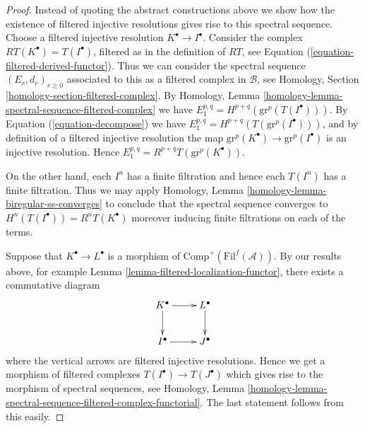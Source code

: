 \begin{proof}
Instead of quoting the abstract constructions above we
show how the existence of filtered injective resolutions gives
rise to this spectral sequence.
Choose a filtered injective resolution $K^\bullet \to I^\bullet$.
Consider the complex $RT(K^\bullet) = T(I^\bullet)$, filtered as
in the definition of $RT$, see
Equation (\ref{equation-filtered-derived-functor}).
Thus we can consider the spectral sequence
$(E_r, d_r)_{r \geq 0}$ associated to
this as a filtered complex in $\mathcal{B}$, see
Homology, Section \ref{homology-section-filtered-complex}.
By
Homology, Lemma \ref{homology-lemma-spectral-sequence-filtered-complex}
we have $E_1^{p, q} = H^{p + q}(\text{gr}^p(T(I^\bullet)))$.
By Equation (\ref{equation-decompose}) we have
$E_1^{p, q} = H^{p + q}(T(\text{gr}^p(I^\bullet)))$, and
by definition of a filtered injective resolution the
map $\text{gr}^p(K^\bullet) \to \text{gr}^p(I^\bullet)$
is an injective resolution. Hence
$E_1^{p, q} = R^{p + q}T(\text{gr}^p(K^\bullet))$.

\medskip\noindent
On the other hand, each $I^n$ has a finite filtration and hence
each $T(I^n)$ has a finite filtration. Thus we may apply
Homology, Lemma \ref{homology-lemma-biregular-ss-converges}
to conclude that the
spectral sequence converges to $H^n(T(I^\bullet)) = R^nT(K^\bullet)$
moreover inducing finite filtrations on each of the terms.

\medskip\noindent
Suppose that $K^\bullet \to L^\bullet$ is a morphism of
$\text{Comp}^{+}(\text{Fil}^f(\mathcal{A}))$. By our results above,
for example Lemma \ref{lemma-filtered-localization-functor}, there
exists a commutative diagram
$$
\xymatrix{
K^\bullet \ar[r] \ar[d] & L^\bullet \ar[d] \\
I^\bullet \ar[r] & J^\bullet
}
$$
where the vertical arrows are filtered injective resolutions.
Hence we get a morphism of filtered complexes
$T(I^\bullet) \to T(J^\bullet)$ which gives rise to the
morphism of spectral sequences, see
Homology,
Lemma \ref{homology-lemma-spectral-sequence-filtered-complex-functorial}.
The last statement follows from this easily.
\end{proof}

